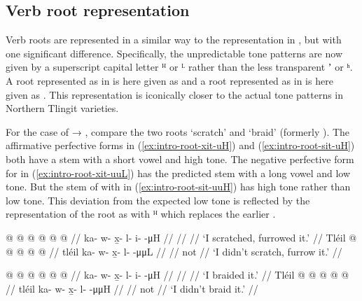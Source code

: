 \subsection{Verb root representation}\label{sec:intro-root}

Verb roots are represented in a similar way to the representation in \cite{crippen:2019}, but with one significant difference.
Specifically, the unpredictable tone patterns are now given by a superscript capital letter ᴴ or ᴸ rather than the less transparent ʼ or ʰ.
A root represented as  in \cite{crippen:2019} is here given as  and a root represented as  in \cite{crippen:2019} is here given as .
This representation is iconically closer to the actual tone patterns in Northern Tlingit varieties.

For the case of  → , compare the two roots  ‘scratch’ and  ‘braid’ (formerly ).
The affirmative perfective forms in (\ref{ex:intro-root-xit-uH}) and (\ref{ex:intro-root-sit-uH}) both have a  stem with a short vowel and high tone.
The negative perfective form for  in (\ref{ex:intro-root-xit-uuL}) has the predicted  stem with a long vowel and low tone.
But the stem of  with  in (\ref{ex:intro-root-sit-uuH}) has high tone rather than low tone.
This deviation from the expected low tone is reflected by the representation of the root as  with ᴴ which replaces the earlier .

\begin{multicols}{2}
\pex\label{ex:intro-root-xit}%
\a\label{ex:intro-root-xit-uH}%
\begingl
	\gla	{} @ {} @ {} @ {} @ {} @ {} @ {} //
	\glb	ka- w- x̱- l- i-  -μH //
	\glc	{}\· \· \· \· \·  \· //
	\gld	{} {} {} {} {} {} {} //
	\glft	‘I scratched, furrowed it.’
		//
\endgl
\a\label{ex:intro-root-xit-uuL}%
\begingl
	\gla	Tléil  @ {} @ {} @ {} @ {} @ {} //
	\glb	tléil ka- w- x̱- l-  -μμL //
	\glc	{} \· \· \· \·  \· //
	\gld	not  {} {} {} {} {} //
	\glft	‘I didn’t scratch, furrow it.’
		//
\endgl
\xe

\pex\label{ex:intro-root-sit}%
\a\label{ex:intro-root-sit-uH}%
\begingl
	\gla	{} @ {} @ {} @ {} @ {} @ {} @ {} //
	\glb	ka- w- x̱- l- i-  -μH //
	\glc	{}\· \· \· \· \·  \· //
	\gld	{} {} {} {} {} {} {} //
	\glft	‘I braided it.’
		//
\endgl
\a\label{ex:intro-root-sit-uuH}%
\begingl
	\gla	Tléil  @ {} @ {} @ {} @ {} @ {} //
	\glb	tléil ka- w- x̱- l-  -μμH //
	\glc	{} \· \· \· \·  \· //
	\gld	not  {} {} {} {} {} //
	\glft	‘I didn’t braid it.’
		//
\endgl
\xe
\end{multicols}

